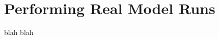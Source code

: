 \documentclass[main.tex]{subfiles}
\begin{document}
\newpage
\setcounter{section}{3}
\section{Performing Real Model Runs}

blah blah
\end{document}

